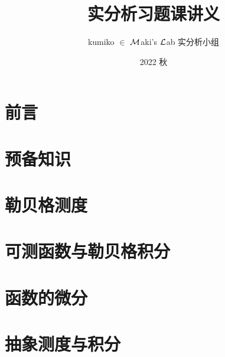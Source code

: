 \documentclass[lang=cn, color=none]{elegantbook}
\title{实分析习题课讲义}
\subtitle{}
\author{kumiko $\in$ $\calM$aki's $\calL$ab 实分析小组}
\institute{$\calM$aki's $\calL$ab}
\date{2022 秋}
\begin{document}

\maketitle
\frontmatter
\chapter*{前言}




\tableofcontents


\mainmatter
\chapter{预备知识}
    
    
    
\chapter{勒贝格测度}
    
    
    
    
    
    
\chapter{可测函数与勒贝格积分}
    

    
    
    
    
    

    

\chapter{函数的微分}
    
    

\chapter{抽象测度与积分}
    
    

\end{document}
